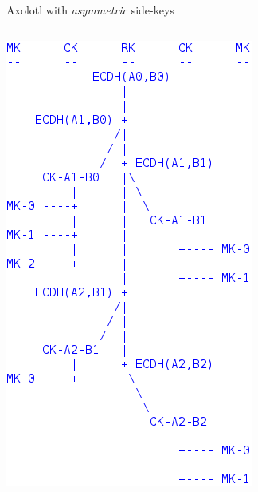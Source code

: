 \documentclass[fleqn,xcolor={usenames,dvipsnames}]{beamer}
\begin{document}
\begin{frame}{Axolotl with {\em asymmetric} side-keys}
\begin{columns}[T]
\includegraphics[width=\textwidth]{../pics/axolotl_diagram}
\end{columns}
\end{frame}


\end{document}
